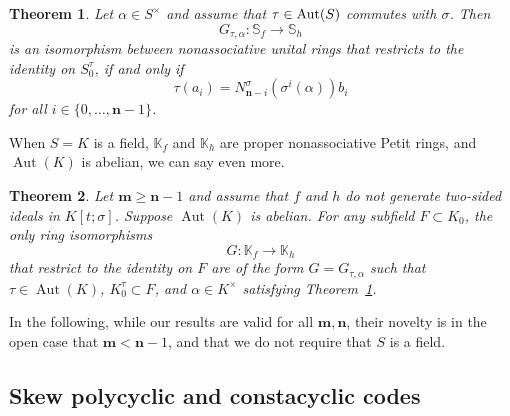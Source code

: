 \documentclass[11pt]{amsart}
\theoremstyle{plain}
\newtheorem{theorem}{Theorem}[section]
\theoremstyle{definition}
\numberwithin{equation}{section}
\numberwithin{figure}{section}
\newcommand{\Sfnew}{\mathbb{S}_{f}}
\newcommand{\Shnew}{\mathbb{S}_{h}} %
\newcommand{\Kfnew}{\mathbb{K}_{f}}
\newcommand{\Khnew}{\mathbb{K}_{h}}
\newcommand{\ring}{S}
\newcommand{\field}{K}
\newcommand{\Ktsigma}{K[t;\sigma]}
\newcommand{\os}{\mathbf{m}}  %
\newcommand{\de}{\mathbf{n}}  %
\DeclareMathOperator{\Aut}{Aut}
\begin{document}
\begin{theorem}\label{T:general_isomorphism_theorem2} \cite[Theorem 4.1]{Pumpluen2025}
Let $\alpha\in S^\times$ and assume that $\tau \in {\rm Aut}(S)$ commutes with $\sigma$. Then
   $$ G_{\tau,\alpha}:  \Sfnew \to \Shnew
    $$
    is an  isomorphism  between nonassociative unital rings that restricts to the identity on  $S_0^\tau$, 
    if and only if
\begin{equation}  \label{equ:necII}
\tau(a_i) =
N_{\de-i}^{\sigma}(\sigma^{i} (\alpha))b_i
\end{equation}
 for all $i \in\{ 0, \ldots, \de-1\}$.
\end{theorem}

When $S=K$ is a field, $\Kfnew$ and $\Khnew$ are proper nonassociative Petit rings, and $\Aut(\field)$ is abelian, we can say even more.


\begin{theorem}\label{T:BPonlyonesareGtaualpha} \cite[Theorem 4.2]{Pumpluen2025}
  Let $\os \geq \de-1$ and assume that $f$ and $h$  do not generate two-sided ideals in $\Ktsigma$.  Suppose $\Aut(\field)$ is abelian.  For any subfield $F\subset \field_0$, the \emph{only} ring isomorphisms
  $$
  G:\Kfnew\to \Khnew
  $$
  that restrict to the identity on $F$
  are of the form $G=G_{\tau,\alpha}$ such that $\tau\in \Aut(\field)$, $\field_0^\tau\subset F$, and $\alpha \in \field^\times$ satisfying Theorem~\ref{T:general_isomorphism_theorem2}.
\end{theorem}


In the following, while our results are valid for all $\os, \de$, their novelty  is in the open case that $\os < \de -1$, and that we do not require that $\ring$ is a field.



 \subsection{Skew polycyclic and constacyclic codes} \label{SectionSkewpolycycliccodes}
\end{document}

